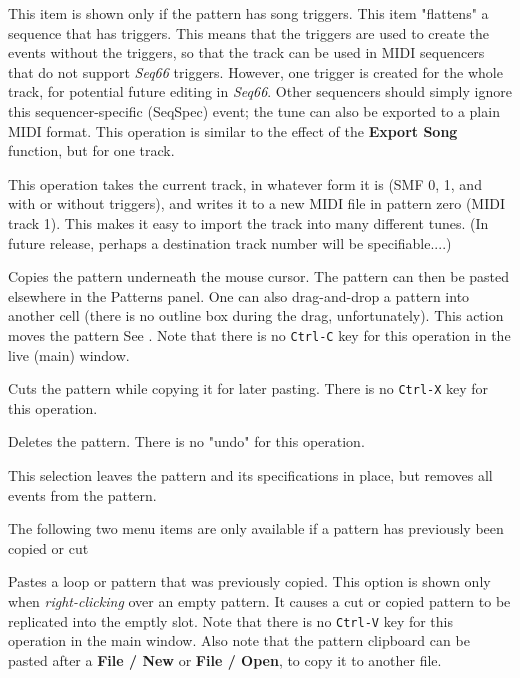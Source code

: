    \setcounter{ItemCounter}{0}      %

   This item is shown only if the pattern has song triggers.
   This item "flattens" a sequence that has triggers.
   This means that the triggers are used to create the events without
   the triggers, so that the track can be used in MIDI sequencers that
   do not support \textsl{Seq66} triggers.
   However, one trigger is created for the whole track, for potential
   future editing in \textsl{Seq66}.
   Other sequencers should simply ignore this sequencer-specific (SeqSpec)
   event; the tune can also be exported to a plain MIDI format.
   This operation is similar to the effect of the \textbf{Export Song}
   function, but for one track.

   This operation takes the current track, in whatever form it is (SMF 0, 1,
   and with or without triggers), and writes it to a new
   MIDI file in pattern zero (MIDI track 1).
   This makes it easy to import the track into many different tunes.
   (In future release, perhaps a destination track number will be
   specifiable....)

   Copies the pattern underneath the mouse cursor.
   The pattern can then be pasted elsewhere in the Patterns panel.
   One can also drag-and-drop a pattern into another cell (there is no outline
   box during the drag, unfortunately).
   This action moves the pattern
   See .
   Note that there is no \texttt{Ctrl-C} key for this operation in the
   live (main) window.

   Cuts the pattern while copying it for later pasting.
   There is no \texttt{Ctrl-X} key for this operation.

   Deletes the pattern.
   There is no "undo" for this operation.

   This selection leaves the pattern and its specifications in place,
   but removes all events from the pattern.

   The following two menu items are only available if a pattern
   has previously been copied or cut

   Pastes a loop or pattern that was previously copied.
   This option is shown only when
   \textsl{right-clicking} over an empty pattern.
   It causes a cut or copied pattern to be replicated into the emptly slot.
   Note that there is no \texttt{Ctrl-V} key for this operation in the
   main window.
   Also note that the pattern clipboard can be pasted after a
   \textbf{File / New} or \textbf{File / Open},
   to copy it to another file.

